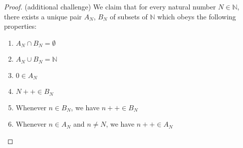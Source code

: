 \begin{proof}{(additional challenge)}
We claim that for every natural number \(N \in \mathds{N}\), there exists a unique pair \(A_N\), \(B_N\) of subsets of \(\mathds{N}\) which obeys the following properties:
    \begin{enumerate}
        \item \(A_N \cap B_N = \emptyset\)
        \item \(A_N \cup B_N = \mathds{N}\)
        \item \(0 \in A_N\)
        \item \(N++ \in B_N\)
        \item Whenever \(n \in B_N\), we have \(n++ \in B_N\)
        \item Whenever \(n \in A_N\) and \(n \neq N\), we have \(n++ \in A_N\)
    \end{enumerate}


\end{proof}

